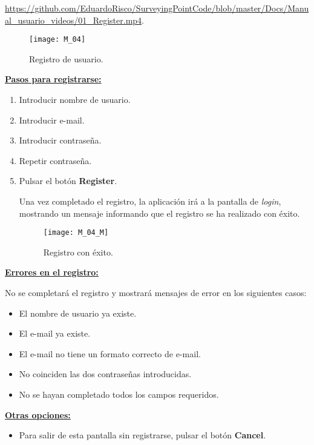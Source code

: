 \url{https://github.com/EduardoRisco/SurveyingPointCode/blob/master/Docs/Manual_usuario_videos/01_Register.mp4}. 

\begin{figure}[H]
	\centering
	\texttt{[image: M\_04]}
	\caption{Registro de usuario.}
	\label{fig:M_04}
\end{figure}

\textbf{\underline{Pasos para registrarse:} }

\begin{enumerate}

\item Introducir nombre de usuario.
\item Introducir e-mail.
\item Introducir contraseña.
\item Repetir contraseña.
\item Pulsar el botón \textbf{Register}.

Una vez completado el registro, la aplicación irá a la pantalla de \emph{login}, mostrando un mensaje informando que el registro se ha realizado con éxito.

\begin{figure}[H]
	\centering
	\texttt{[image: M\_04\_M]}
	\caption{Registro con éxito.}
	\label{fig:M_04_M}
\end{figure}

\end{enumerate}

\textbf{\underline{Errores en el registro:} }

No se completará el registro y mostrará mensajes de error en los siguientes casos:

\begin{itemize}
\item El nombre de usuario ya existe.
\item El e-mail ya existe.
\item El e-mail no tiene un formato correcto de e-mail.
\item No coinciden las dos contraseñas introducidas.
\item No se hayan completado todos los campos requeridos.

\end{itemize}

\textbf{\underline{Otras opciones:} }
\begin{itemize}
\item Para salir de esta pantalla sin registrarse, pulsar el botón \textbf{Cancel}.
\end{itemize}

